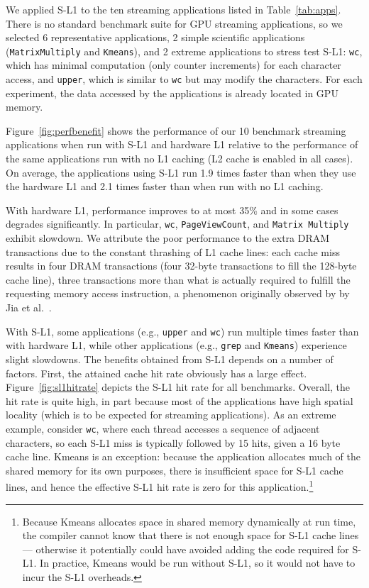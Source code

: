 We applied S-L1 to the ten streaming applications listed in Table~\ref{tab:apps}. 
There is no standard benchmark suite for GPU streaming applications, so we selected 6 representative applications, 2 simple scientific applications (\texttt{MatrixMultiply} and \texttt{Kmeans}), and 2 extreme applications to stress test S-L1: \texttt{wc}, which has minimal computation (only counter increments) for each character access, and \texttt{upper}, which is similar to \texttt{wc} but may modify the characters.
For each experiment, the data accessed by the applications is already located in GPU memory.


Figure~\ref{fig:perfbenefit} shows the performance of our 10 benchmark streaming applications when run with S-L1 and hardware L1 
relative to the performance of the same applications run with no L1 caching (L2 cache is enabled in all cases).
On average, the applications using S-L1 run 1.9 times faster than when they use the hardware L1 and 2.1 times faster than when
run with no L1 caching.

With hardware L1, performance improves to at most 35\% and in some cases degrades significantly.
In particular, \texttt{wc},  \texttt{PageViewCount}, and \texttt{Matrix
Multiply} exhibit slowdown.
We attribute the poor performance to the extra DRAM transactions due to the
constant thrashing of L1 cache lines: each cache miss results in four DRAM
transactions (four 32-byte transactions to fill the 128-byte cache line), three
transactions more than what is actually required to fulfill the requesting
memory access instruction, a phenomenon originally observed by by Jia et al.~\cite{jia2012characterizing}.



With S-L1, some applications (e.g., \texttt{upper} and \texttt{wc}) run
multiple times faster than with hardware L1, while other applications (e.g., \texttt{grep}
and \texttt{Kmeans}) experience slight slowdowns. The benefits obtained from
S-L1 depends on a number of factors.
First, the attained cache hit rate obviously has a large effect.
Figure~\ref{fig:sl1hitrate} depicts the S-L1 hit rate for all benchmarks. 
Overall, the hit rate is quite high, in part because most of the applications have high spatial
locality (which is to be expected for streaming applications). 
As an extreme example, consider \texttt{wc}, where each thread accesses a sequence of adjacent characters, so each S-L1 miss is typically followed by 15 hits, given a 16 byte cache line.
Kmeans is an exception: because the application allocates much of the shared memory for its own purposes, there is insufficient space for S-L1 cache lines, and hence the effective S-L1 hit rate is zero for this application.\footnote{
	Because Kmeans allocates space in shared memory dynamically at run time,
	the compiler cannot know that there is not enough space for S-L1  cache lines ---
	otherwise it potentially could have avoided adding the code required for S-L1. In
	practice, Kmeans would be run without S-L1, so it would not have to incur the S-L1 overheads.}

